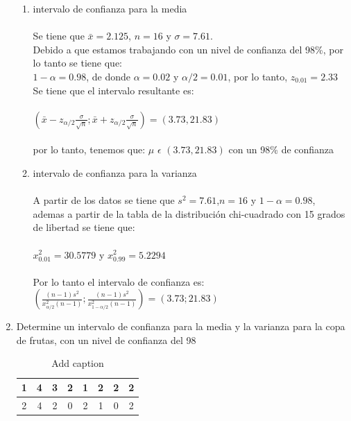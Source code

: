 \documentclass{article}
\begin{document}
\begin{enumerate}
    \begin{enumerate}{}
       
        \item{intervalo de confianza para la media}
            \paragraph{}Se tiene que $\bar{x}=2.125$, $n=16$ y $\sigma=7.61$.\\
            Debido a que estamos trabajando con un nivel de confianza del 98\%, por lo tanto se tiene que:\\ 
            $1-\alpha=0.98$, de donde $\alpha=0.02 $ y $\alpha/2=0.01$, por lo tanto, $z_{0.01}=2.33$ 
            Se tiene que el intervalo resultante es: \\\\
            $(\bar{x}-z_{\alpha/2}\frac{\sigma}{\sqrt{n}};\bar{x}+z_{\alpha/2}\frac{\sigma}{\sqrt{n}})=(3.73,21.83)$\\\\
            por lo tanto, tenemos que: $\mu$ $\epsilon$ $(3.73,21.83)$ con un 98\% de confianza
        

        \item {intervalo de confianza para la varianza}
        \paragraph{} A partir de los datos se tiene que $s^2=7.61$,$n=16$ y $1-\alpha=0.98$, ademas a partir de la tabla de la distribución chi-cuadrado con 15 grados de libertad se tiene que: \\\\
        $x_{0.01}^2=30.5779$ y $x_{0.99}^2=5.2294$ \\\\
        Por lo tanto el intervalo de confianza es: $(\frac{(n-1)s^2}{x_{\alpha/2}^2(n-1)};\frac{(n-1)s^2}{x_{1-\alpha/2}^2(n-1)})=(3.73;21.83)$ 
        
    \end{enumerate}   
    \item Determine un intervalo de confianza para la media y la varianza para la copa de frutas, con un nivel de confianza del 98%
\begin{table}[htbp]
    \centering
    \caption{Add caption}
      \begin{tabular}{|c|c|c|c|c|c|c|c|}
      \toprule
      1     & 4     & 3     & 2     & 1     & 2     & 2     & 2 \\
      \midrule
      2     & 4     & 2     & 0     & 2     & 1     & 0     & 2 \\
      \bottomrule
      \end{tabular}%
    \label{tab:addlabel}%
  \end{table}%
  

\end{enumerate}
\end{document}
